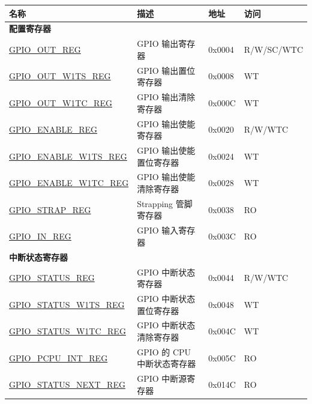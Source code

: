 \begin{longtable}{ | p{5.8cm} | p{7.2cm} | p{1.3cm} | p{2cm} | }
\hline\rowcolor{lightgray}
\textbf{名称} & \textbf{描述} & \textbf{地址} & \textbf{访问} \\ \hline
\endhead

\multicolumn{4}{|l|}{\textbf{配置寄存器}} \\ \hline
\hyperref[regdesc:GPIOOUTREG]{GPIO\_OUT\_REG} & GPIO 输出寄存器 & 0x0004 & R/W/SC/WTC \\ \hline
\hyperref[regdesc:GPIOOUTW1TSREG]{GPIO\_OUT\_W1TS\_REG} & GPIO 输出置位寄存器 & 0x0008 & WT \\ \hline
\hyperref[regdesc:GPIOOUTW1TCREG]{GPIO\_OUT\_W1TC\_REG} & GPIO 输出清除寄存器 & 0x000C & WT \\ \hline
\hyperref[regdesc:GPIOENABLEREG]{GPIO\_ENABLE\_REG} & GPIO 输出使能寄存器 & 0x0020 & R/W/WTC \\ \hline
\hyperref[regdesc:GPIOENABLEW1TSREG]{GPIO\_ENABLE\_W1TS\_REG} & GPIO 输出使能置位寄存器 & 0x0024 & WT \\ \hline
\hyperref[regdesc:GPIOENABLEW1TCREG]{GPIO\_ENABLE\_W1TC\_REG} & GPIO 输出使能清除寄存器 & 0x0028 & WT \\ \hline
\hyperref[regdesc:GPIOSTRAPREG]{GPIO\_STRAP\_REG} & Strapping 管脚寄存器 & 0x0038 & RO \\ \hline
\hyperref[regdesc:GPIOINREG]{GPIO\_IN\_REG} & GPIO 输入寄存器 & 0x003C & RO \\ \hline

\multicolumn{4}{|l|}{\textbf{中断状态寄存器}} \\ \hline
\hyperref[regdesc:GPIOSTATUSREG]{GPIO\_STATUS\_REG} & GPIO 中断状态寄存器 & 0x0044 & R/W/WTC \\ \hline
\hyperref[regdesc:GPIOSTATUSW1TSREG]{GPIO\_STATUS\_W1TS\_REG} & GPIO 中断状态置位寄存器 & 0x0048 & WT \\ \hline
\hyperref[regdesc:GPIOSTATUSW1TCREG]{GPIO\_STATUS\_W1TC\_REG} & GPIO 中断状态清除寄存器 & 0x004C & WT \\ \hline
\hyperref[regdesc:GPIOPCPUINTREG]{GPIO\_PCPU\_INT\_REG} & GPIO 的 CPU 中断状态寄存器 & 0x005C & RO \\ \hline

\hyperref[regdesc:GPIOSTATUSNEXTREG]{GPIO\_STATUS\_NEXT\_REG} & GPIO 中断源寄存器 & 0x014C & RO \\ \hline


\end{longtable}
